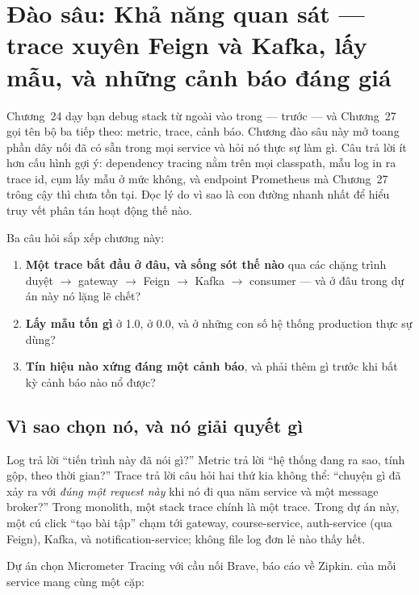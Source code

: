 \chapter{Đào sâu: Khả năng quan sát --- trace xuyên Feign và Kafka, lấy mẫu, và những cảnh báo đáng giá}
\label{ch:dd-observability}

Chương~24 dạy bạn debug stack từ ngoài vào trong --- 
trước  --- và Chương~27 gọi tên bộ ba tiếp theo: metric,
trace, cảnh báo. Chương đào sâu này mở toang phần dây nối đã có sẵn
trong mọi service và hỏi nó thực sự làm gì. Câu trả lời ít hơn cấu hình
gợi ý: dependency tracing nằm trên mọi classpath, mẫu log in ra trace
id, cụm lấy mẫu ở mức không, và endpoint Prometheus mà Chương~27 trông
cậy thì chưa tồn tại. Đọc lý do vì sao là con đường nhanh nhất để hiểu
truy vết phân tán hoạt động thế nào.

Ba câu hỏi sắp xếp chương này:

\begin{enumerate}
  \item \textbf{Một trace bắt đầu ở đâu, và sống sót thế nào} qua các
  chặng trình duyệt $\rightarrow$ gateway $\rightarrow$ Feign
  $\rightarrow$ Kafka $\rightarrow$ consumer --- và ở đâu trong dự án
  này nó lặng lẽ chết?
  \item \textbf{Lấy mẫu tốn gì} ở 1.0, ở 0.0, và ở những con số hệ
  thống production thực sự dùng?
  \item \textbf{Tín hiệu nào xứng đáng một cảnh báo}, và phải thêm gì
  trước khi bất kỳ cảnh báo nào nổ được?
\end{enumerate}

\section{Vì sao chọn nó, và nó giải quyết gì}

Log trả lời ``tiến trình này đã nói gì?'' Metric trả lời ``hệ thống
đang ra sao, tính gộp, theo thời gian?'' Trace trả lời câu hỏi hai thứ
kia không thể: ``chuyện gì đã xảy ra với \emph{đúng một request này}
khi nó đi qua năm service và một message broker?'' Trong monolith,
một stack trace chính là một trace. Trong dự án này, một cú click
``tạo bài tập'' chạm tới gateway, course-service, auth-service (qua
Feign), Kafka, và notification-service; không file log đơn lẻ nào
thấy hết.

Dự án chọn Micrometer Tracing với cầu nối Brave, báo cáo về Zipkin.
 của mỗi service mang cùng một cặp:

